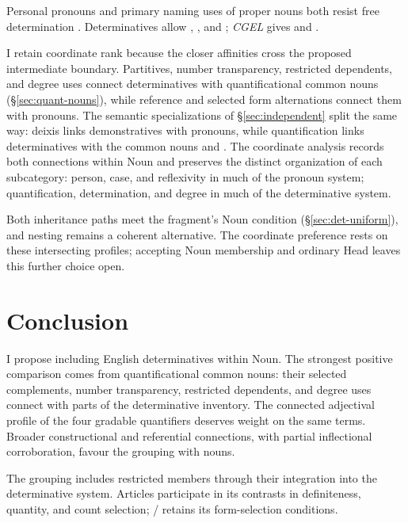 \documentclass[12pt]{article}
\begin{document}
Personal pronouns and primary naming uses of proper nouns both resist free determination \citep[429--430, 517, 519--520]{huddleston2002}. Determinatives allow , , and ; \textit{CGEL} gives  and  \citep[415--416]{huddleston2002}.

I retain coordinate rank because the closer affinities cross the proposed intermediate boundary. Partitives, number transparency, restricted dependents, and degree uses connect determinatives with quantificational common nouns (§\ref{sec:quant-nouns}), while reference and selected form alternations connect them with pronouns. The semantic specializations of §\ref{sec:independent} split the same way: deixis links demonstratives with pronouns, while quantification links determinatives with the common nouns  and . The coordinate analysis records both connections within Noun and preserves the distinct organization of each subcategory: person, case, and reflexivity in much of the pronoun system; quantification, determination, and degree in much of the determinative system.

Both inheritance paths meet the fragment's Noun condition (§\ref{sec:det-uniform}), and nesting remains a coherent alternative. The coordinate preference rests on these intersecting profiles; accepting Noun membership and ordinary Head leaves this further choice open.

\section{Conclusion}\label{sec:conclusion}

I propose including English determinatives within Noun. The strongest positive comparison comes from quantificational common nouns: their selected complements, number transparency, restricted dependents, and degree uses connect with parts of the determinative inventory. The connected adjectival profile of the four gradable quantifiers deserves weight on the same terms. Broader constructional and referential connections, with partial inflectional corroboration, favour the grouping with nouns.

The grouping includes restricted members through their integration into the determinative system. Articles participate in its contrasts in definiteness, quantity, and count selection; / retains its form-selection conditions.
\end{document}
